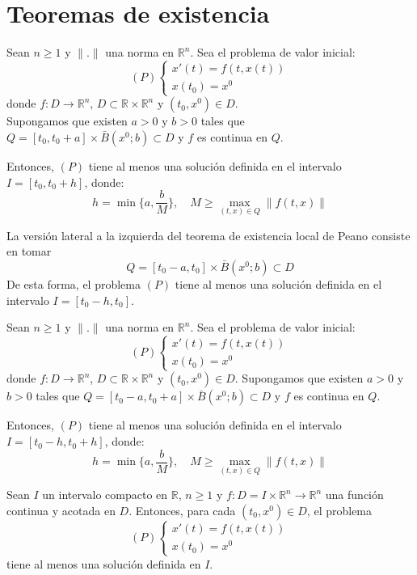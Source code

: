 \chapter{Teoremas de existencia}
\begin{theorem}
    Sean $n \geq 1$ y $\|.\|$ una norma en $\mathbb{R}^n$.
    Sea el problema de valor inicial:
    $$(P) \begin{cases}
            x'(t) = f(t, x(t)) \\
            x(t_0) = x^0
        \end{cases}$$
    donde $f: D \to \mathbb{R}^n$, $D \subset \mathbb{R} \times \mathbb{R}^n$ y $(t_0, x^0) \in D$.\\
    Supongamos que existen $a > 0$ y $b > 0$ tales que $Q = [t_0, t_0 + a] \times \bar{B}(x^0; b) \subset D$ y $f$ es continua en $Q$.

    Entonces, $(P)$ tiene al menos una solución definida en el intervalo $I = [t_0, t_0 + h]$, donde:
    $$h = \min\{a, \frac{b}{M}\}, \quad M \geq \max_{(t, x) \in Q} \|f(t, x)\|$$
\end{theorem}

\begin{remark}
    La versión lateral a la izquierda del teorema de existencia local de Peano consiste en tomar
    $$Q = [t_0 - a, t_0] \times \bar{B}(x^0; b) \subset D$$
    De esta forma, el problema $(P)$ tiene al menos una solución definida en el intervalo $I = [t_0 - h, t_0]$.
\end{remark}

\begin{corollary}
    Sean $n \geq 1$ y $\|.\|$ una norma en $\mathbb{R}^n$.
    Sea el problema de valor inicial:
    $$(P) \begin{cases}
            x'(t) = f(t, x(t)) \\
            x(t_0) = x^0
        \end{cases}$$
    donde $f: D \to \mathbb{R}^n$, $D \subset \mathbb{R} \times \mathbb{R}^n$ y $(t_0, x^0) \in D$.
    Supongamos que existen $a > 0$ y $b > 0$ tales que $Q = [t_0 - a, t_0 + a] \times \bar{B}(x^0; b) \subset D$ y $f$ es continua en $Q$.

    Entonces, $(P)$ tiene al menos una solución definida en el intervalo $I = [t_0 - h, t_0 + h]$, donde:
    $$h = \min\{a, \frac{b}{M}\}, \quad M \geq \max_{(t, x) \in Q} \|f(t, x)\|$$
\end{corollary}

\begin{theorem}
    Sean $I$ un intervalo compacto en $\mathbb{R}$, $n \geq 1$ y $f: D = I \times \mathbb{R}^n \to \mathbb{R}^n$ una función continua y acotada en $D$.
    Entonces, para cada $(t_0, x^0) \in D$, el problema
    $$(P) \begin{cases}
            x'(t) = f(t, x(t)) \\
            x(t_0) = x^0
        \end{cases}$$
    tiene al menos una solución definida en $I$.
\end{theorem}
